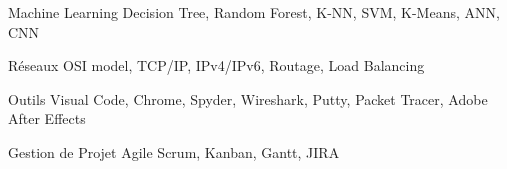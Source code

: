 \begin{cvskills}

\cvskill
    {Machine Learning} %
    {Decision Tree, Random Forest, K-NN, SVM, K-Means, ANN, CNN } %

 \cvskill
    {Réseaux} %
    {OSI model, TCP/IP, IPv4/IPv6, Routage, Load Balancing   } %

\cvskill
    {Outils} %
    {Visual Code, Chrome, Spyder, Wireshark, Putty, Packet Tracer, Adobe After Effects  } %


\cvskill
    {Gestion de Projet} %
    {Agile Scrum, Kanban, Gantt, JIRA } %

\end{cvskills}
